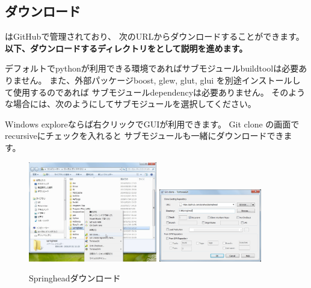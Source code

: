 \subsection{ダウンロード}
\label{subsec:Download}
\parindent=0pt

\SprLib はGitHubで管理されており、
次のURLからダウンロードすることができます。
\bf{以下、ダウンロードするディレクトリを\SprTop{}として説明を進めます。}

\medskip

デフォルトでpythonが利用できる環境であればサブモジュールbuildtoolは必要ありません。
また、外部パッケージboost, glew, glut, glui を別途インストールして使用するのであれば
サブモジュールdependencyは必要ありません。
そのような場合には、次のようにしてサブモジュールを選択してください。


\medskip
Windows exploreならば右クリックでGUIが利用できます。
Git clone の画面で recursiveにチェックを入れると
サブモジュールも一緒にダウンロードできます。

\begin{narrow}[15pt]
	\begin{figure}[h]
	\begin{center}
	\includegraphics[width=0.5\textwidth]{fig/SpringheadClone1.eps}
	\includegraphics[width=0.4\textwidth]{fig/SpringheadClone2.eps}
	\end{center}
	\caption{Springheadダウンロード}
	\label{fig:SpringheadClone}
	\end{figure}
\end{narrow}


\newpage

